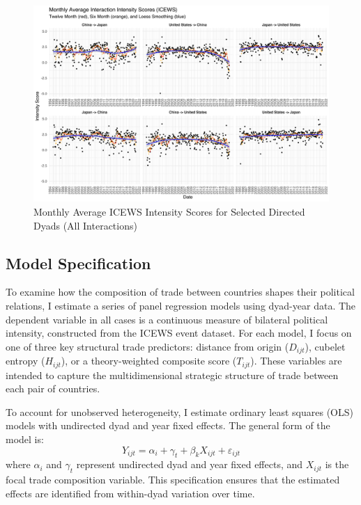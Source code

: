 \documentclass[12pt]{article}
\begin{document}
\clearpage
\begin{landscape}
\begin{figure}[H]
    \centering
    \includegraphics[width=1.4\textwidth]{figures/ICEWS_Directed_Dyads_Faceted.pdf}
    \caption{Monthly Average ICEWS Intensity Scores for Selected Directed Dyads (All Interactions)}
\end{figure}
\end{landscape}
\clearpage

\subsection{Model Specification}
To examine how the composition of trade between countries shapes their political relations, I estimate a series of panel regression models using dyad-year data. The dependent variable in all cases is a continuous measure of bilateral political intensity, constructed from the ICEWS event dataset. For each model, I focus on one of three key structural trade predictors: distance from origin ($D_{ijt}$), cubelet entropy ($H_{ijt}$), or a theory-weighted composite score ($T_{ijt}$). These variables are intended to capture the multidimensional strategic structure of trade between each pair of countries.

To account for unobserved heterogeneity, I estimate ordinary least squares (OLS) models with undirected dyad and year fixed effects. The general form of the model is:
\begin{equation}
Y_{ijt} = \alpha_i + \gamma_t + \beta_k X_{ijt} + \varepsilon_{ijt}
\end{equation}
where $\alpha_i$ and $\gamma_t$ represent undirected dyad and year fixed effects, and $X_{ijt}$ is the focal trade composition variable. This specification ensures that the estimated effects are identified from within-dyad variation over time.
\end{document}
